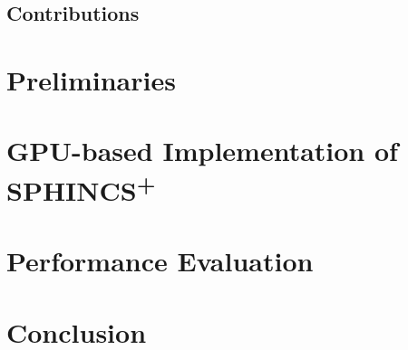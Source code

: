 \documentclass[journal]{IEEEtran}
\begin{document}
\subsection{Contributions}

\section{Preliminaries}

\section{GPU-based Implementation of \texorpdfstring{SPHINCS\textsuperscript{+}}{SPHINCS+}}

\section{Performance Evaluation}

\section{Conclusion}

\color{black}



\end{document}
